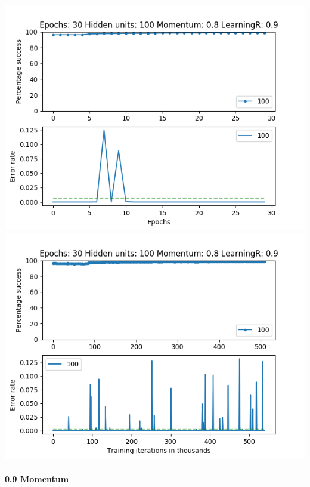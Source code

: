 \documentclass[11pt]{article}
\makeatletter
\def\maxwidth{\ifdim\Gin@nat@width>\linewidth\linewidth
    \else\Gin@nat@width\fi}
\let\Oldincludegraphics\includegraphics
\renewcommand{\includegraphics}[1]{\Oldincludegraphics[width=.8\maxwidth]{#1}}
\makeatother
\begin{document}
\includegraphics{Experiment1/E1_NN_Epoch_Momentum_0.8_30Epochs_100_LR_0.9_Hiddenunits.png}
\includegraphics{Experiment1/E1_NN_Training_Momentum_0.8_30Epochs_100_LR_0.9_Hiddenunits.png}

\hypertarget{momentum-9}{%
\paragraph{0.9 Momentum}\label{momentum-9}}
\end{document}
